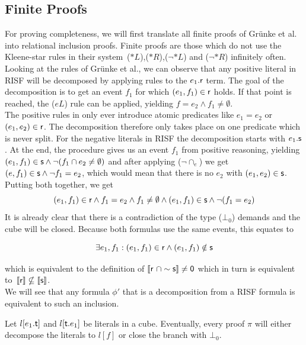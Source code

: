 \documentclass[a4paper,twoside,12pt, english]{article}
\begin{document}
\subsection{Finite Proofs}\label{sec:finiteproofs}

For proving completeness, we will first translate all finite proofs of Grünke et al. into relational inclusion proofs. Finite proofs are those which do not use the Kleene-star rules in their system~($*L$),($*R$),($\neg *L$) and ($\neg *R$) infinitely often. \\
Looking at the rules of Grünke et al., we can observe that any positive literal in RISF will be decomposed by applying rules to the $e_1.\textsf{\upshape r}$ term. The goal of the decomposition is to get an event $f_1$ for which $(e_1,f_1) \in \textsf{\upshape r}$ holds. If that point is reached, the ($eL$) rule can be applied, yielding $f=e_2 \land f_1 \neq \emptyset$. \\
The positive rules in \cite{Gru+26} only ever introduce atomic predicates like $e_1 = e_2$ or $(e_1,e_2) \in \textsf{\upshape r}$. The decomposition therefore only takes place on one predicate which is never split.
\newpage
For the negative literals in RISF the decomposition starts with $e_1.\textsf{\upshape s}$. At the end, the procedure gives us an event $f_1$ from positive reasoning, yielding $(e_1,f_1) \in \textsf{\upshape s} \land \neg (f_1 \cap e_2 \neq \emptyset)$ and after applying ($\neg \cap_e$) we get $(e,f_1) \in \textsf{\upshape s} \land \neg f_1=e_2$, which would mean that there is no $e_2$ with $(e_1,e_2) \in \textsf{\upshape s}$. 
Putting both together, we get
\[(e_1,f_1) \in \textsf{\upshape r} \land f_1 = e_2 \land f_1 \neq \emptyset \land (e_1,f_1) \in \textsf{\upshape s} \land \neg (f_1 =e_2)\]
It is already clear that there is a contradiction of the type ($\bot_0$) demands and the cube will be closed.  
Because both formulas use the same events, this equates to

\[\exists e_1,f_1: (e_1,f_1) \in \textsf{\upshape r} \land (e_1,f_1) \notin \textsf{\upshape s}\]

\noindent which is equivalent to the definition of $\llbracket \textsf{\upshape r}~ \cap \sim \textsf{\upshape s} \rrbracket \neq \textsf{\upshape 0}$ which in turn is equivalent to~$\llbracket \textsf{\upshape r} \rrbracket \nsubseteq \llbracket \textsf{\upshape s} \rrbracket$. \\
We will see that any formula $\phi'$ that is a decomposition from a RISF formula is equivalent to such an inclusion.

\begin{lemma}\label{lem:decomposition}
Let $l[e_1.\textsf{\upshape t}]$ and $l[\textsf{\upshape t}.e_1]$ be literals in a cube. Eventually, every proof $\pi$ will either decompose the literals to $l[f]$ or close the branch with $\bot_0$.
\end{lemma}
\end{document}
